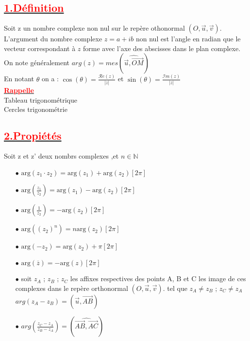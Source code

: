 \documentclass[12pt]{article}
\begin{document}
\subsection*{\underline{\textbf{\textcolor{red}{1.Définition}}}}
Soit z un nombre complexe non nul sur le repère othonormal $(O,\vec{u},\vec{v})$. L'argument du nombre complexe $z = a + ib$ non nul est l'angle en radian que le vecteur correspondant à $z$ forme avec l'axe des abscisses dans le plan complexe.\\ On note généralement $arg(z)=mes(\widehat{\vec{u},\vec{OM}})$\\
En notant $\theta$ on a : $\cos(\theta)=\frac{\mathcal{R}e(z)}{|z|}$ et 
$\sin(\theta)=\frac{\mathcal{I}m(z)}{|z|}$\\
\underline{\textbf{\textcolor{red}{Rappelle}}}\\
Tableau trigonométrique\\
Cercles trigonométrie\\
\subsection*{\underline{\textbf{\textcolor{red}{2.Propiétés}}}}
Soit z et z' deux nombrs complexes ,et $n\in \mathbb{N}$\\
\begin{itemize}
\item[$\bullet$] $\text{{arg}}(z_1 \cdot z_2) = \text{{arg}}(z_1) + \text{{arg}}(z_2)[2\pi]$\\
\item[$\bullet$] $\text{{arg}}(\frac{z_1}{z_2}) = \text{{arg}}(z_1) - \text{{arg}}(z_2)[2\pi]$\\
\item[$\bullet$] $\text{{arg}}(\frac{1}{z_2}) = - \text{{arg}}(z_2)[2\pi]$\\
\item[$\bullet$] $\text{{arg}}((z_2)^{n}) = n\text{{arg}}(z_2)[2\pi]$\\
\item[$\bullet$] $\text{{arg}}(-z_2) = \text{{arg}}(z_2)+\pi[2\pi]$\\
\item[$\bullet$] $\text{{arg}}(\overline{z}) = -\text{{arg}}(z)[2\pi]$\\
\item[$\bullet$] soit $z_A$ ; $z_B$ ; $z_C$ les affixes respectives des points A, B et C les image de ces complexes dans le repère orthonormal $(O,\vec{u},\vec{v})$. tel que $z_A \neq z_B$ ; 
$z_C \neq z_A$ $arg(z_A-z_B)=(\vec{u},\vec{AB})$
\item[$\bullet$] $arg(\frac{z_C-z_A}{z_B-z_A})=(\widehat{\vec{AB},\vec{AC}})$
\end{itemize}
\end{document}
